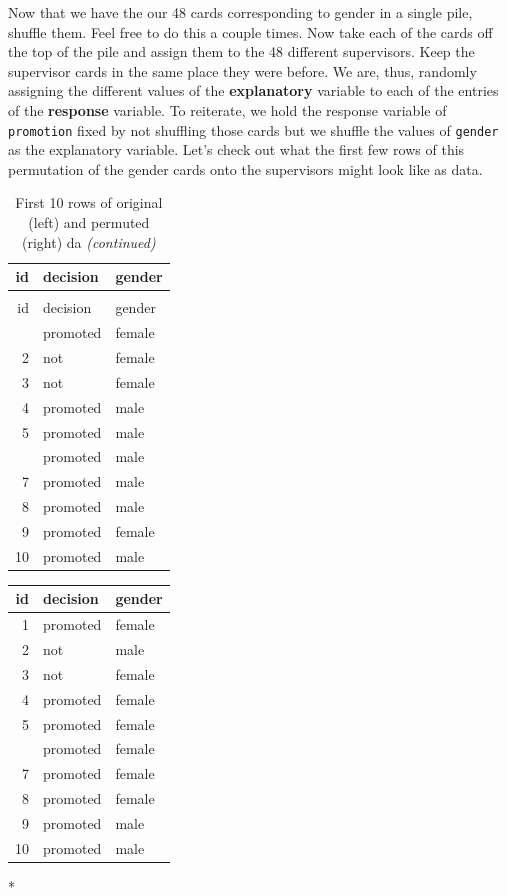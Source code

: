 \documentclass[12pt, krantz2,]{krantz}
\begin{document}
Now that we have the our 48 cards corresponding to gender in a single pile, shuffle them. Feel free to do this a couple times. Now take each of the cards off the top of the pile and assign them to the 48 different supervisors. Keep the supervisor cards in the same place they were before. We are, thus, randomly assigning the different values of the \textbf{explanatory} variable to each of the entries of the \textbf{response} variable. To reiterate, we hold the response variable of \texttt{promotion} fixed by not shuffling those cards but we shuffle the values of \texttt{gender} as the explanatory variable. Let's check out what the first few rows of this permutation of the gender cards onto the supervisors might look like as data.

\begingroup\fontsize{10}{12}\selectfont
\begin{table}
\caption{\label{tab:compare-first-10}\label{tab:compare-first-10}First 10 rows of original (left) and permuted (right) data}

\begin{longtable}{rll}
\toprule
id & decision & gender\\
\midrule
\endfirsthead
\caption[]{\label{tab:compare-first-10}First 10 rows of original (left) and permuted (right) da \textit{(continued)}}\\
\toprule
id & decision & gender\\
\midrule
\endhead
\
\endfoot
\bottomrule
\endlastfoot
1 & promoted & female\\
2 & not & female\\
3 & not & female\\
4 & promoted & male\\
5 & promoted & male\\
\addlinespace
6 & promoted & male\\
7 & promoted & male\\
8 & promoted & male\\
9 & promoted & female\\
10 & promoted & male\\*
\end{longtable}
\begin{longtable}{rll}
\toprule
id & decision & gender\\
\midrule
1 & promoted & female\\
2 & not & male\\
3 & not & female\\
4 & promoted & female\\
5 & promoted & female\\
\addlinespace
6 & promoted & female\\
7 & promoted & female\\
8 & promoted & female\\
9 & promoted & male\\
10 & promoted & male\\
\end{longtable}*
\end{table}
\endgroup{}
\end{document}
